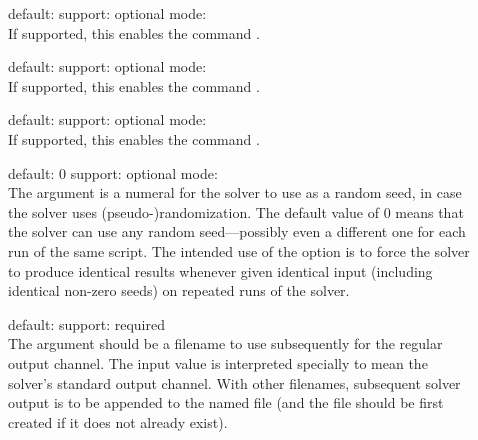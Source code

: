 \begin{description}
\item[] 
\quad default: 
\quad support: optional
\quad mode: 
\\
If supported, this enables the command .  

\item[] 
\quad default: 
\quad support: optional
\quad mode: 
\\
If supported, this enables the command .  

\item[] 
\quad default: 
\quad support: optional
\quad mode: 
\\
If supported, this enables the command .  

\item[] 
\quad default: $0$
\quad support: optional
\quad mode: 
\\
The argument is a numeral for the solver to use as a random seed,
in case the solver uses (pseudo-)randomization.
The default value of $0$ means that the solver can use any random seed---possibly 
even a different one for each run of the same script.
The intended use of the option is to force the solver to produce identical results 
whenever given identical input (including identical non-zero seeds) on repeated runs of the solver.

\item[] 
\quad default: 
\quad support: required
\\
The argument should be a filename to use subsequently for
the regular output channel.  The input value  is interpreted
specially to mean the solver's standard output channel.
With other filenames, subsequent solver output is to be appended to the named file 
(and the file should be first created if it does not  already exist).


\end{description}
